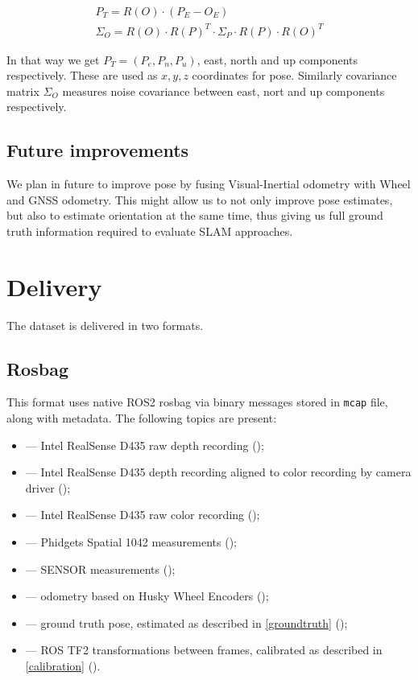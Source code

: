 \begin{gather*}
    P_T = R(O)\cdot (P_E - O_E) \\
    \Sigma_O =R(O) \cdot R(P)^T \cdot \Sigma_P \cdot R(P) \cdot R(O)^T
\end{gather*}

\vspace{0.2cm}
\noindent In that way we get $P_T = (P_e, P_n, P_u)$, east, north and up components respectively. These are used as $x, y, z$ coordinates for pose. Similarly covariance matrix $\Sigma_O$ measures noise covariance between east, nort and up components respectively.

\subsection{Future improvements}

We plan in future to improve pose by fusing Visual-Inertial odometry with Wheel and GNSS odometry. This might allow us to not only improve pose estimates, but also to estimate orientation at the same time, thus giving us full ground truth information required to evaluate SLAM approaches.

\section{Delivery} \label{delivery}

The dataset is delivered in two formats.

\subsection{Rosbag}

This format uses native ROS2 rosbag via binary messages stored in \texttt{mcap} file, along with metadata. The following topics are present:

\begin{itemize}
    \item {} --- Intel RealSense D435 raw depth recording ();
    \item {} --- Intel RealSense D435 depth recording aligned to color recording by camera driver ();
    \item {} --- Intel RealSense D435 raw color recording ();
    \item {} --- Phidgets Spatial 1042 measurements ();
    \item {} --- SENSOR measurements ();
    \item {} --- odometry based on Husky Wheel Encoders ();
    \item {} --- ground truth pose, estimated as described in \cref{groundtruth} ();
    \item {} --- ROS TF2 transformations between frames, calibrated as described in \cref{calibration} ().
\end{itemize}


